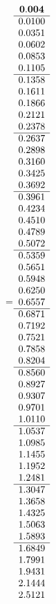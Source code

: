 =\hbox{$\begin{array}{c}
\bf 0.004 
 \\ \hline 
  0.0100 \\ 
  0.0351 \\ 
  0.0602 \\ 
  0.0853 \\ 
  0.1105
 \\ \hline 
  0.1358 \\ 
  0.1611 \\ 
  0.1866 \\ 
  0.2121 \\ 
  0.2378
 \\ \hline 
  0.2637 \\ 
  0.2898 \\ 
  0.3160 \\ 
  0.3425 \\ 
  0.3692
 \\ \hline 
  0.3961 \\ 
  0.4234 \\ 
  0.4510 \\ 
  0.4789 \\ 
  0.5072
 \\ \hline 
  0.5359 \\ 
  0.5651 \\ 
  0.5948 \\ 
  0.6250 \\ 
  0.6557
 \\ \hline 
  0.6871 \\ 
  0.7192 \\ 
  0.7521 \\ 
  0.7858 \\ 
  0.8204
 \\ \hline 
  0.8560 \\ 
  0.8927 \\ 
  0.9307 \\ 
  0.9701 \\ 
  1.0110
 \\ \hline 
  1.0537 \\ 
  1.0985 \\ 
  1.1455 \\ 
  1.1952 \\ 
  1.2481
 \\ \hline 
  1.3047 \\ 
  1.3658 \\ 
  1.4325 \\ 
  1.5063 \\ 
  1.5893
 \\ \hline 
  1.6849 \\ 
  1.7991 \\ 
  1.9431 \\ 
  2.1444 \\ 
  2.5121
 \end{array}$}
